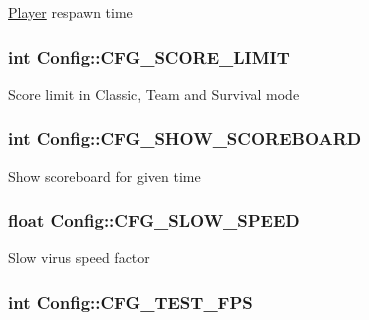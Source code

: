 \hyperlink{class_player}{Player} respawn time \hypertarget{class_config_aaaeb9bd360747827480435b90d0f4906}{
\subsubsection[{C\-F\-G\-\_\-\-S\-C\-O\-R\-E\-\_\-\-L\-I\-M\-I\-T}]{\setlength{\rightskip}{0pt plus 5cm}int Config\-::\-C\-F\-G\-\_\-\-S\-C\-O\-R\-E\-\_\-\-L\-I\-M\-I\-T}}\label{class_config_aaaeb9bd360747827480435b90d0f4906}
Score limit in Classic, Team and Survival mode \hypertarget{class_config_a4d8faf4496d7fad5ce922354581e7c2b}{
\subsubsection[{C\-F\-G\-\_\-\-S\-H\-O\-W\-\_\-\-S\-C\-O\-R\-E\-B\-O\-A\-R\-D}]{\setlength{\rightskip}{0pt plus 5cm}int Config\-::\-C\-F\-G\-\_\-\-S\-H\-O\-W\-\_\-\-S\-C\-O\-R\-E\-B\-O\-A\-R\-D}}\label{class_config_a4d8faf4496d7fad5ce922354581e7c2b}
Show scoreboard for given time \hypertarget{class_config_a1e059aee7b0dccef0baeae3ac1e51ff8}{
\subsubsection[{C\-F\-G\-\_\-\-S\-L\-O\-W\-\_\-\-S\-P\-E\-E\-D}]{\setlength{\rightskip}{0pt plus 5cm}float Config\-::\-C\-F\-G\-\_\-\-S\-L\-O\-W\-\_\-\-S\-P\-E\-E\-D}}\label{class_config_a1e059aee7b0dccef0baeae3ac1e51ff8}
Slow virus speed factor \hypertarget{class_config_a793412c185315af74569b94cd3904e8a}{
\subsubsection[{C\-F\-G\-\_\-\-T\-E\-S\-T\-\_\-\-F\-P\-S}]{\setlength{\rightskip}{0pt plus 5cm}int Config\-::\-C\-F\-G\-\_\-\-T\-E\-S\-T\-\_\-\-F\-P\-S}}\label{class_config_a793412c185315af74569b94cd3904e8a}
